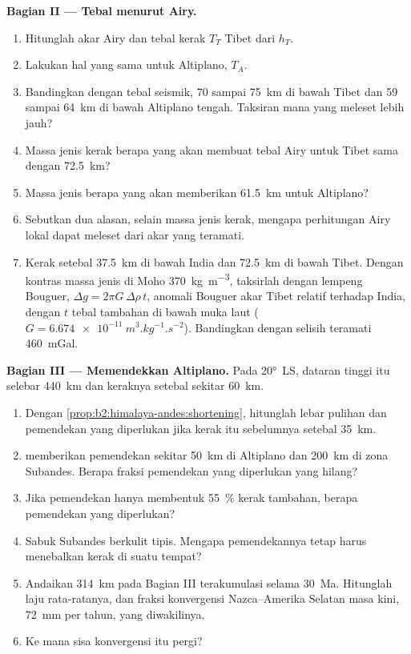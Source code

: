 \begin{problem}
\noindent\textbf{Bagian II --- Tebal menurut Airy.}
\begin{enumerate}[resume]
\item Hitunglah akar Airy dan tebal kerak $T_T$ Tibet dari $h_T$.
\item Lakukan hal yang sama untuk Altiplano, $T_A$.
\item Bandingkan dengan tebal seismik, 70 sampai \qty{75}{km} di bawah Tibet dan 59 sampai
\qty{64}{km} di bawah Altiplano tengah. Taksiran mana yang meleset lebih jauh?
\item Massa jenis kerak berapa yang akan membuat tebal Airy untuk Tibet sama dengan \qty{72.5}{km}?
\item Massa jenis berapa yang akan memberikan \qty{61.5}{km} untuk Altiplano?
\item Sebutkan dua alasan, selain massa jenis kerak, mengapa perhitungan Airy lokal dapat
meleset dari akar yang teramati.
\item Kerak setebal \qty{37.5}{km} di bawah India dan \qty{72.5}{km} di bawah Tibet. Dengan
kontras massa jenis di Moho \qty{370}{kg.m^{-3}}, taksirlah dengan lempeng Bouguer, $\Delta g
= 2\pi G\,\Delta\rho\,t$, anomali Bouguer akar Tibet relatif terhadap India, dengan $t$
tebal tambahan di bawah muka laut ($G = \qty{6.674e-11}{m^3.kg^{-1}.s^{-2}}$). Bandingkan dengan
selisih teramati \qty{460}{mGal}.
\end{enumerate}

\noindent\textbf{Bagian III --- Memendekkan Altiplano.} Pada \ang{20}~LS, dataran tinggi itu
selebar \qty{440}{km} dan keraknya setebal sekitar \qty{60}{km}.
\begin{enumerate}[resume]
\item Dengan \cref{prop:b2:himalaya-andes:shortening}, hitunglah lebar pulihan dan
pemendekan yang diperlukan jika kerak itu sebelumnya setebal \qty{35}{km}.
\item {} memberikan pemendekan sekitar \qty{50}{km} di Altiplano dan
\qty{200}{km} di zona Subandes. Berapa fraksi pemendekan yang diperlukan yang hilang?
\item Jika pemendekan hanya membentuk \qty{55}{\percent} kerak tambahan, berapa pemendekan yang
diperlukan?
\item Sabuk Subandes berkulit tipis. Mengapa pemendekannya tetap harus menebalkan kerak
di suatu tempat?
\item Andaikan \qty{314}{km} pada Bagian III terakumulasi selama \qty{30}{Ma}. Hitunglah laju
rata-ratanya, dan fraksi konvergensi Nazca--Amerika Selatan masa kini, \qty{72}{mm} per tahun, yang
diwakilinya.
\item Ke mana sisa konvergensi itu pergi?
\end{enumerate}


\end{problem}
